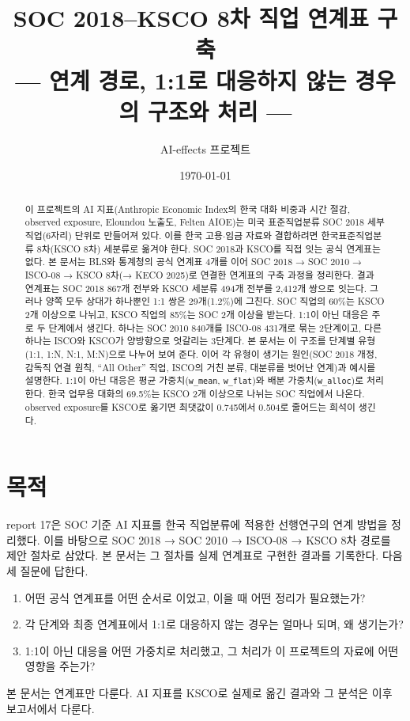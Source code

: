 \documentclass[11pt]{article}
\title{SOC 2018–KSCO 8차 직업 연계표 구축\\[2mm]
\large --- 연계 경로, 1:1로 대응하지 않는 경우의 구조와 처리 ---}
\author{AI-effects 프로젝트}
\date{\today}
\begin{document}
\maketitle

\begin{abstract}
\noindent 이 프로젝트의 AI 지표(Anthropic Economic Index의 한국 대화 비중과 시간 절감, observed exposure, Eloundou 노출도, Felten AIOE)는 미국 표준직업분류 SOC 2018 세부 직업(6자리) 단위로 만들어져 있다. 이를 한국 고용$\cdot$임금 자료와 결합하려면 한국표준직업분류 8차(KSCO 8차) 세분류로 옮겨야 한다. SOC 2018과 KSCO를 직접 잇는 공식 연계표는 없다. 본 문서는 BLS와 통계청의 공식 연계표 4개를 이어 SOC 2018 → SOC 2010 → ISCO-08 → KSCO 8차(→ KECO 2025)로 연결한 연계표의 구축 과정을 정리한다. 결과 연계표는 SOC 2018 867개 전부와 KSCO 세분류 494개 전부를 2,412개 쌍으로 잇는다. 그러나 양쪽 모두 상대가 하나뿐인 1:1 쌍은 29개(1.2\%)에 그친다. SOC 직업의 60\%는 KSCO 2개 이상으로 나뉘고, KSCO 직업의 85\%는 SOC 2개 이상을 받는다. 1:1이 아닌 대응은 주로 두 단계에서 생긴다. 하나는 SOC 2010 840개를 ISCO-08 431개로 묶는 2단계이고, 다른 하나는 ISCO와 KSCO가 양방향으로 엇갈리는 3단계다. 본 문서는 이 구조를 단계별 유형(1:1, 1:N, N:1, M:N)으로 나누어 보여 준다. 이어 각 유형이 생기는 원인(SOC 2018 개정, 감독직 연결 원칙, ``All Other'' 직업, ISCO의 거친 분류, 대분류를 벗어난 연계)과 예시를 설명한다. 1:1이 아닌 대응은 평균 가중치(\texttt{w\_mean}, \texttt{w\_flat})와 배분 가중치(\texttt{w\_alloc})로 처리한다. 한국 업무용 대화의 69.5\%는 KSCO 2개 이상으로 나뉘는 SOC 직업에서 나온다. observed exposure를 KSCO로 옮기면 최댓값이 0.745에서 0.504로 줄어드는 희석이 생긴다.
\end{abstract}

\tableofcontents

\section{목적}

report 17은 SOC 기준 AI 지표를 한국 직업분류에 적용한 선행연구의 연계 방법을 정리했다. 이를 바탕으로 SOC 2018 → SOC 2010 → ISCO-08 → KSCO 8차 경로를 제안 절차로 삼았다. 본 문서는 그 절차를 실제 연계표로 구현한 결과를 기록한다. 다음 세 질문에 답한다.
\begin{enumerate}[leftmargin=*]
  \item 어떤 공식 연계표를 어떤 순서로 이었고, 이을 때 어떤 정리가 필요했는가?
  \item 각 단계와 최종 연계표에서 1:1로 대응하지 않는 경우는 얼마나 되며, 왜 생기는가?
  \item 1:1이 아닌 대응을 어떤 가중치로 처리했고, 그 처리가 이 프로젝트의 자료에 어떤 영향을 주는가?
\end{enumerate}
본 문서는 연계표만 다룬다. AI 지표를 KSCO로 실제로 옮긴 결과와 그 분석은 이후 보고서에서 다룬다.
\end{document}
